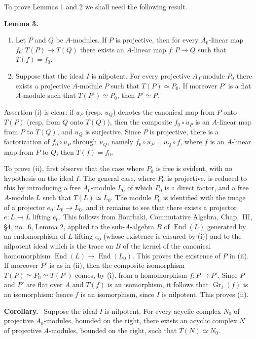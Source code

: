 \documentclass[11pt]{article}
\newenvironment{statement}[1]{\par\medskip\noindent\textbf{#1.}\ }{\par\medskip}
\providecommand{\End}{\operatorname{End}}
\providecommand{\End}{\operatorname{End}}
\begin{document}
To prove Lemmas 1 and 2 we shall need the following result.

\begin{statement}{Lemma 3}
\begin{enumerate}[label=(\roman*)]
\item Let $P$ and $Q$ be $A$-modules. If $P$ is projective, then for every $A_0$-linear map $f_0:T(P)\to T(Q)$ there exists an $A$-linear map $f:P\to Q$ such that $T(f)=f_0$.
\item Suppose that the ideal $I$ is nilpotent. For every projective $A_0$-module $P_0$ there exists a projective $A$-module $P$ such that $T(P)\simeq P_0$. If moreover $P'$ is a flat $A$-module such that $T(P')\simeq P_0$, then $P'\simeq P$.
\end{enumerate}
\end{statement}

Assertion (i) is clear: if $u_P$ (resp. $u_Q$) denotes the canonical map from $P$ onto $T(P)$ (resp. from $Q$ onto $T(Q)$), then the composite $f_0\circ u_P$ is an $A$-linear map from $P$ to $T(Q)$, and $u_Q$ is surjective. Since $P$ is projective, there is a factorization of $f_0\circ u_P$ through $u_Q$, namely $f_0\circ u_P=u_Q\circ f$, where $f$ is an $A$-linear map from $P$ to $Q$; then $T(f)=f_0$.

To prove (ii), first observe that the case where $P_0$ is free is evident, with no hypothesis on the ideal $I$. The general case, where $P_0$ is projective, is reduced to this by introducing a free $A_0$-module $L_0$ of which $P_0$ is a direct factor, and a free $A$-module $L$ such that $T(L)\simeq L_0$. The module $P_0$ is identified with the image of a projector $e_0:L_0\to L_0$, and it remains to see that there exists a projector $e:L\to L$ lifting $e_0$. This follows from Bourbaki, Commutative Algebra, Chap.~III, §4, no.~6, Lemma 2, applied to the sub-$A$-algebra $B$ of $\End(L)$ generated by an endomorphism of $L$ lifting $e_0$ (whose existence is ensured by (i)) and to the nilpotent ideal which is the trace on $B$ of the kernel of the canonical homomorphism $\End(L)\to\End(L_0)$. This proves the existence of $P$ in (ii). If moreover $P'$ is as in (ii), then the composite isomorphism $T(P)\simeq P_0\simeq T(P')$ comes, by (i), from a homomorphism $f:P\to P'$. Since $P$ and $P'$ are flat over $A$ and $T(f)$ is an isomorphism, it follows that $\operatorname{Gr}_I(f)$ is an isomorphism; hence $f$ is an isomorphism, since $I$ is nilpotent. This proves (ii).

\begin{statement}{Corollary}
Suppose the ideal $I$ is nilpotent. For every acyclic complex $N_0$ of projective $A_0$-modules, bounded on the right, there exists an acyclic complex $N$ of projective $A$-modules, bounded on the right, such that $T(N)\simeq N_0$.
\end{statement}
\end{document}
